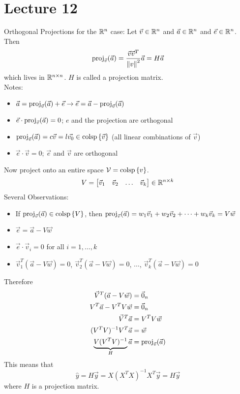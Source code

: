 \documentclass[12pt]{article}
\begin{document}
\section{Lecture 12} 
Orthogonal Projections for the $\mathbb{R}^{ n }$ case: Let $\vec{v} \in \mathbb{R}^{ n }$ and $\vec{a} \in \mathbb{R}^{ n }$ and $\vec{e} \in \mathbb{R}^{ n }$. Then $$\text{proj}_{ \vec{v} } ( \vec{a} ) = \frac{\vec{v}\vec{v}^T}{\norm{v}^2} \vec{a} = H\vec{a} $$ which lives in $\mathbb{R}^{ n\times n }$. 
$H$ is called a projection matrix. \\Notes: \begin{itemize} 
\item $\vec{a} = \text{proj}_{ \vec{v} } ( \vec{a} ) + \vec{e} \to \vec{e} = \vec{a} - \text{proj}_{ \vec{v} } ( \vec{a} )$
\item $\vec{e} \cdot \text{proj}_{ \vec{v} } ( \vec{a} ) = 0$; $e$ and the projection are orthogonal 
\item $\text{proj}_{ \vec{v} } ( \vec{a} ) = c\vec{v} = l\vec{v_0} \in \mathrm{colsp}\left\{ \vec{v} \right\}$ (all linear combinations of $\vec{v}$)
\item $\vec{e} \cdot \vec{v} = 0$; $\vec{e}$ and $\vec{v}$ are orthogonal \end{itemize} 
Now project onto an entire space $\mathcal{V} = \mathrm{colsp}\left\{ v \right\}$. 
$$V = \begin{bmatrix} \vec{v}_1 & \vec{v}_2 & \hdots & \vec{v}_k \end{bmatrix} \in \mathbb{R}^{ n\times k } $$ 
Several Observations: \begin{itemize} 
\item If $\text{proj}_{ \vec{v} } ( \vec{a} ) \in \mathrm{colsp}\left\{ V \right\}$, then $\text{proj}_{ \vec{v} } ( \vec{a} ) = w_1\vec{v}_1 + w_2\vec{v}_2 + \dots + w_k\vec{v}_k = V\vec{w}$
\item $\vec{e} = \vec{a} - V\vec{w}$
\item $\vec{e} \cdot \vec{v}_i = 0$ for all $i = 1,\dots,k$ 
\item $\vec{v}_1^T(\vec{a} - V\vec{w}) = 0$, $\vec{v}_2^T(\vec{a} - V\vec{w}) = 0$, $\dots$, $\vec{v}_k^T(\vec{a} - V\vec{w}) = 0$
\end{itemize} 
Therefore $$ \begin{aligned} \vec{V}^T(\vec{a} - V\vec{w}) &= \vec{0}_n \\ V^T\vec{a} - V^TV\vec{w} &= \vec{0}_n \\ \vec{V}^T\vec{a} &= V^TV\vec{w} \\ (V^TV)^{-1}V^T\vec{a} &= \vec{w} \\
\underbrace{V(V^TV)^{-1}}_H \vec{a} &= \text{proj}_{ \vec{v} } ( \vec{a} ) \end{aligned} $$
This means that $$\hat{y} = H\vec{y} = X(X^TX)^{-1}X^T\vec{y} = H\vec{y}$$ where $H$ is a projection matrix. \\~\\
\end{document}
